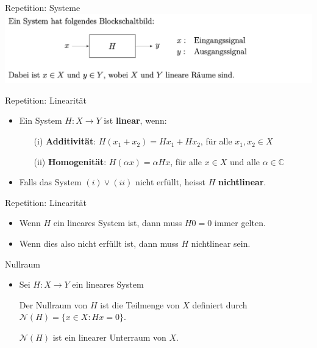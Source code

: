 \documentclass[14pt, aspectratio=169, handout]{beamer}
\begin{document}
\begin{frame}{Repetition: Systeme}
    \includegraphics[width=1.1\linewidth]{figures/System_Blockschaltbild.png}
\end{frame}

\begin{frame}{Repetition: Linearität}
    \begin{itemize}
        \item Ein System $H:X \to Y$ ist \textbf{linear}, wenn:
        \item[] \begin{itemize}
            \item[] 
            \item[(i)] \textbf{Additivität}: $H(x_1 + x_2) = Hx_1 + Hx_2$, für alle $x_1,x_2 \in X$
            \item[] 
            \item[(ii)] \textbf{Homogenität}: $H(\alpha x) = \alpha H x$, für alle $x\in X$ und alle $\alpha \in \mathbb{C}$
        \end{itemize}
        \item[]  
        \item Falls das System $(i) \lor (ii)$ nicht erfüllt, heisst $H$ \textbf{nichtlinear}.
    \end{itemize}  
\end{frame}

\begin{frame}{Repetition: Linearität}
    \begin{itemize}
        \item Wenn $H$ ein lineares System ist, dann muss $H0 = 0$ immer gelten.
        \item[] 
        \item Wenn dies also nicht erfüllt ist, dann muss $H$ nichtlinear sein.
    \end{itemize}
\end{frame}

\begin{frame}{Nullraum}
    \begin{itemize}
        \item Sei $H:X \to Y$ ein lineares System
        \item[] 
        \item[] Der Nullraum von $H$ ist die Teilmenge von $X$ definiert durch $\mathcal{N}(H) = \{x \in X : Hx = 0\}$.
        \item[] 
        \item[] $\mathcal{N}(H)$ ist ein linearer Unterraum von $X$.
        \item[] 
        \item[] 
        \item[] 
    \end{itemize}
\end{frame}
\end{document}
